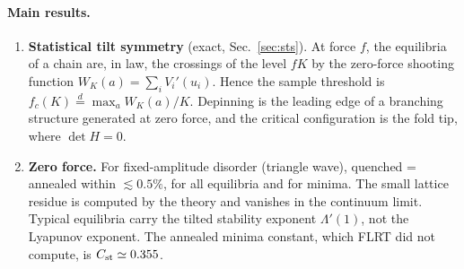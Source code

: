 \documentclass[10pt,a4paper]{article}
\begin{document}
\paragraph{Main results.}
\begin{enumerate}
\item \textbf{Statistical tilt symmetry} (exact, Sec.~\ref{sec:sts}). At force $f$, the equilibria of a chain are, in law, the crossings of the level $fK$ by the zero-force shooting function $W_K(a)=\sum_iV_i'(u_i)$. Hence the sample threshold is $f_c(K)\overset{d}{=}\max_aW_K(a)/K$. Depinning is the leading edge of a branching structure generated at zero force, and the critical configuration is the fold tip, where $\det H=0$.
\item \textbf{Zero force.} For fixed-amplitude disorder (triangle wave), quenched = annealed within $\lesssim0.5\%$, for all equilibria and for minima. The small lattice residue is computed by the theory and vanishes in the continuum limit. Typical equilibria carry the tilted stability exponent $\Lambda'(1)$, not the Lyapunov exponent. The annealed minima constant, which FLRT did not compute, is $C_{\rm st}\simeq0.355$.


\end{enumerate}
\end{document}
